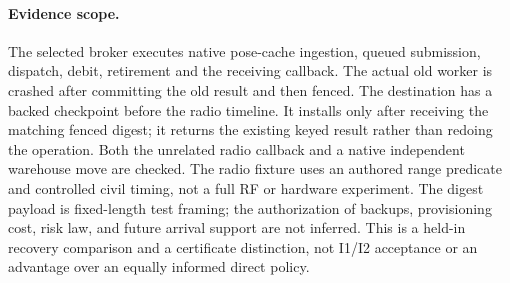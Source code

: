 \documentclass{article}
\begin{document}
\paragraph{Evidence scope.}
The selected broker executes native pose-cache ingestion, queued submission, dispatch, debit,
retirement and the receiving callback. The actual old worker is
crashed after committing the old result and then fenced. The
destination has a backed checkpoint before the radio timeline. It
installs only after receiving the matching fenced digest; it returns
the existing keyed result rather than redoing the operation. Both
the unrelated radio callback and a native independent warehouse
move are checked. The radio fixture uses an authored range predicate
and controlled civil timing, not a full RF or hardware experiment.
The digest payload is fixed-length test framing; the authorization
of backups, provisioning cost, risk law, and future arrival support
are not inferred. This is a held-in recovery comparison and a
certificate distinction, not I1/I2 acceptance or an advantage over
an equally informed direct policy.
\end{document}
